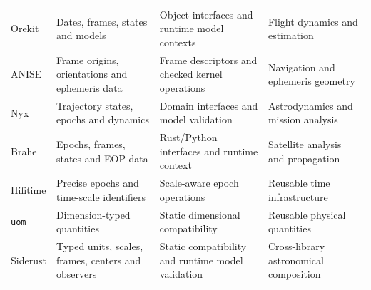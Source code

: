 \begin{table}[!tbp]
\begin{tabularx}{\textwidth}{@{}lYYY@{}}
        Orekit                                         & Dates, frames, states and models                   & Object interfaces and runtime model contexts & Flight
        dynamics and estimation                                                                                                                                            \\

        ANISE                                          & Frame origins, orientations and ephemeris data     & Frame descriptors and checked kernel
        operations                                     & Navigation and ephemeris geometry                                                                                 \\

        Nyx                                            & Trajectory states, epochs and dynamics             & Domain interfaces and model validation       &
        Astrodynamics and mission analysis                                                                                                                                 \\

        Brahe                                          & Epochs, frames, states and EOP data                & Rust/Python interfaces and runtime context   &
        Satellite analysis and propagation                                                                                                                                 \\

        Hifitime                                       & Precise epochs and time-scale identifiers          & Scale-aware epoch operations                 & Reusable time
        infrastructure                                                                                                                                                     \\

        \texttt{uom}                                   &
        Dimension-typed quantities                     &
        Static dimensional compatibility               &
        Reusable physical quantities                                                                                                                                       \\

        Siderust                                       & Typed units, scales, frames, centers and observers & Static compatibility and runtime
        model validation                               & Cross-library astronomical composition                                                                            \\ \bottomrule
    \end{tabularx}
\end{table}

